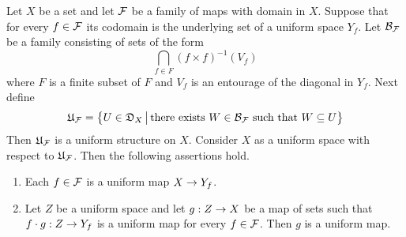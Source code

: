 \documentclass[10pt]{amsart}
\begin{document}
\begin{theorem}\label{theorem:uniformity_induced_by_family_of_maps}
	Let $X$ be a set and let ${\mathcal F}$ be a family of maps with domain in $X$. Suppose that for every $f \in {\mathcal F}$ its codomain is the underlying set of a uniform space $Y_f$. Let ${\mathcal B}_{{\mathcal F}}$ be a family consisting of sets of the form
	$$\bigcap_{f\in F}\left(f\times f\right)^{-1}(V_f)$$
	where $F$ is a finite subset of $F$ and $V_f$ is an entourage of the diagonal in $Y_f$. Next define
	$${\mathfrak U}_{{\mathcal F}} = \big\{U\in {\mathfrak D}_X\,\big|\,\mbox{there exists }W\in {\mathcal B}_{{\mathcal F}}\mbox{ such that }W \subseteq U\big\}$$
	Then ${\mathfrak U}_{{\mathcal F}}$ is a uniform structure on $X$. Consider $X$ as a uniform space with respect to ${\mathfrak U}_{{\mathcal F}}$. Then the following assertions hold.
	\begin{enumerate}[label=\emph{\textbf{(\arabic*)}}, leftmargin=3.0em]
		\item Each $f \in {\mathcal F}$ is a uniform map $X \rightarrow Y_f$.
		\item Let $Z$ be a uniform space and let $g:Z\rightarrow X$ be a map of sets such that $f\cdot g:Z\rightarrow Y_f$ is a uniform map for every $f\in {\mathcal F}$. Then $g$ is a uniform map.
	\end{enumerate}
\end{theorem}
\end{document}
